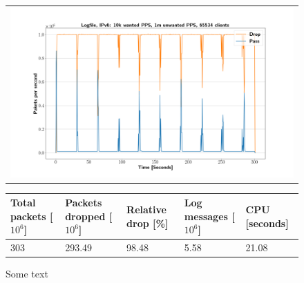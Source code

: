 \begin{figure}[!h]
	\label{fig:simplefail2ban:disk:ip6:1m}
	\centering
	\scriptsize
	\begin{tabular}{c}
    	\centerline{\includegraphics[width=1.2\textwidth]{images/simplefail2ban_disk_ipv6_v10k_iv1m_c65534.png}}
	\end{tabular}
	\begin{tabular}{lllll}
		\toprule
		\textbf{Total packets [$10^6$]} & \textbf{Packets dropped [$10^6$]} & \textbf{Relative drop [\%]} & \textbf{Log messages [$10^6$]} & \textbf{CPU [seconds]} \\ \midrule 
		303 & 293.49 & 98.48 & 5.58 & 21.08 \\
		\bottomrule
	\end{tabular}
	\caption[Simplefail2ban, Logfile IPv6, 1m \ac{PPS}]{Some text}
\end{figure}


